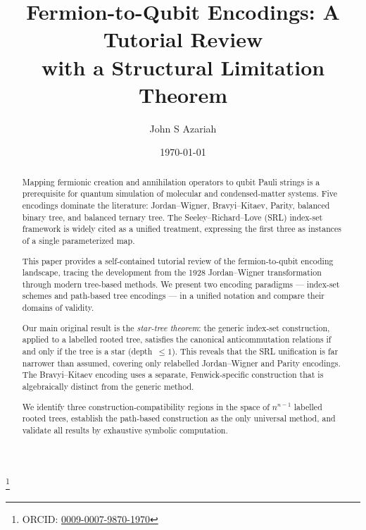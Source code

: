 \documentclass[aps,pra,preprint,superscriptaddress,showpacs]{revtex4-2}
\theoremstyle{definition}
\theoremstyle{remark}
\begin{document}
\title{Fermion-to-Qubit Encodings: A Tutorial Review\\
  with a Structural Limitation Theorem}

\author{John S Azariah}
\thanks{ORCID: \href{https://orcid.org/0009-0007-9870-1970}{0009-0007-9870-1970}}

\date{\today}

\begin{abstract}
Mapping fermionic creation and annihilation operators to qubit Pauli
strings is a prerequisite for quantum simulation of molecular and
condensed-matter systems.  Five encodings dominate the literature:
Jordan--Wigner, Bravyi--Kitaev, Parity, balanced binary tree, and
balanced ternary tree.  The Seeley--Richard--Love (SRL) index-set
framework is widely cited as a unified treatment, expressing the first
three as instances of a single parameterized map.

This paper provides a self-contained tutorial review of the
fermion-to-qubit encoding landscape, tracing the development from the
1928 Jordan--Wigner transformation through modern tree-based methods.
We present two encoding paradigms --- index-set schemes and path-based
tree encodings --- in a unified notation and compare their domains of
validity.

Our main original result is the \emph{star-tree theorem}: the generic
index-set construction, applied to a labelled rooted tree, satisfies
the canonical anticommutation relations if and only if the tree is a
star (depth~$\le 1$).  This reveals that the SRL unification is far
narrower than assumed, covering only relabelled Jordan--Wigner and
Parity encodings.  The Bravyi--Kitaev encoding uses a separate,
Fenwick-specific construction that is algebraically distinct from the
generic method.

We identify three construction-compatibility regions in the space of
$n^{n-1}$ labelled rooted trees, establish the path-based construction
as the only universal method, and validate all results by exhaustive
symbolic computation.
\end{abstract}

\maketitle
\tableofcontents
\end{document}
